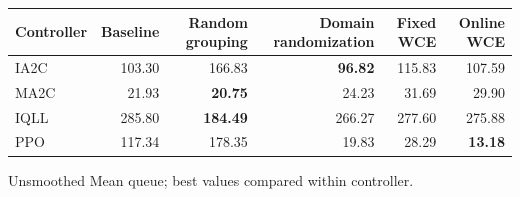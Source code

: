 \begin{tabular}{lrrrrr}
\hline
Controller & Baseline & Random grouping & Domain randomization & Fixed WCE & Online WCE \\
\hline
IA2C & 103.30 & 166.83 & \textbf{96.82} & 115.83 & 107.59 \\
MA2C & 21.93 & \textbf{20.75} & 24.23 & 31.69 & 29.90 \\
IQLL & 285.80 & \textbf{184.49} & 266.27 & 277.60 & 275.88 \\
PPO & 117.34 & 178.35 & 19.83 & 28.29 & \textbf{13.18} \\
\hline
\end{tabular}
Unsmoothed Mean queue; best values compared within controller.
